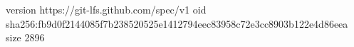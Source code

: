 version https://git-lfs.github.com/spec/v1
oid sha256:fb9d0f2144085f7b238520525e1412794eec83958c72e3cc8903b122e4d86eea
size 2896
